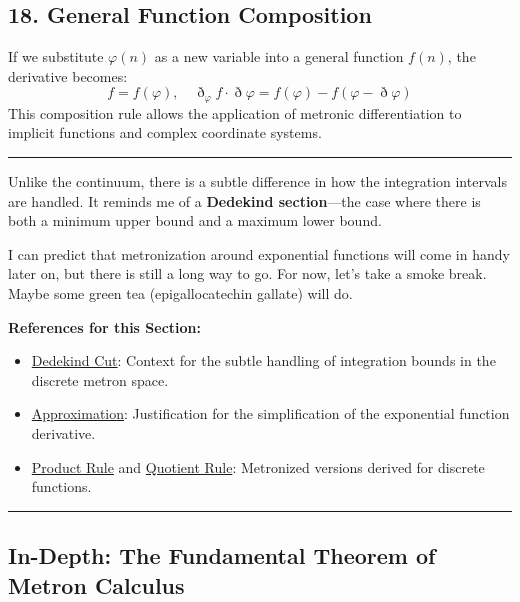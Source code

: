 \documentclass[11pt,a4paper,oneside]{article}
\newenvironment{sectionrefs}
  {\par\vspace{1em}\noindent\textbf{\textsf{References for this Section:}}\begin{itemize}[leftmargin=*, label={\scriptsize$\blacksquare$}, itemsep=2pt]}
  {\end{itemize}}
\newcommand{\hr}{\par\vspace{2em}\noindent\rule{\linewidth}{0.4pt}\par\vspace{2em}}
\begin{document}
\subsection{18. General Function Composition}

If we substitute $\varphi(n)$ as a new variable into a general function $f(n)$, the derivative becomes:
\begin{equation}
    f = f(\varphi), \quad \eth_\varphi f \cdot \eth \varphi = f(\varphi) - f(\varphi - \eth \varphi) \tag{M8}
\end{equation}
This composition rule allows the application of metronic differentiation to implicit functions and complex coordinate systems.

\hr

\begin{reflectionbox}[title={Notes and Reflections: The Discrete Section}]
Unlike the continuum, there is a subtle difference in how the integration intervals are handled. It reminds me of a \textbf{Dedekind section}—the case where there is both a minimum upper bound and a maximum lower bound.

I can predict that metronization around exponential functions will come in handy later on, but there is still a long way to go. For now, let's take a smoke break. Maybe some green tea (epigallocatechin gallate) will do.
\end{reflectionbox}

\begin{sectionrefs}
    \item \href{https://en.wikipedia.org/wiki/Dedekind_cut}{Dedekind Cut}: Context for the subtle handling of integration bounds in the discrete metron space.
    \item \href{https://en.wikipedia.org/wiki/Approximation}{Approximation}: Justification for the simplification of the exponential function derivative.
    \item \href{https://en.wikipedia.org/wiki/Product_rule}{Product Rule} and \href{https://en.wikipedia.org/wiki/Quotient_rule}{Quotient Rule}: Metronized versions derived for discrete functions.
\end{sectionrefs}

\hr

\subsection*{In-Depth: The Fundamental Theorem of Metron Calculus}
\end{document}

